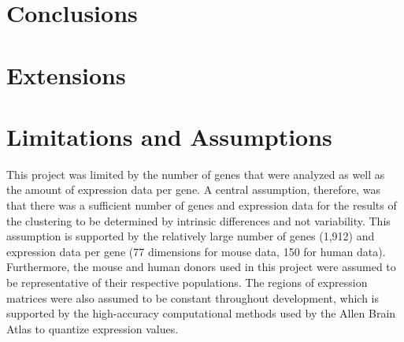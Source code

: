 \documentclass[12pt,oneside,onecolumn,a4paper]{article}
\begin{document}
\section{Conclusions}

\section{Extensions}




\appendix

\section{Limitations and Assumptions}

This project was limited by the number of genes that were analyzed as well as the amount of expression data per gene. A central assumption, therefore, was that there was a sufficient number of genes and expression data for the results of the clustering to be determined by intrinsic differences and not variability. This assumption is supported by the relatively large number of genes (1,912) and expression data per gene (77 dimensions for mouse data, 150 for human data). Furthermore, the mouse and human donors used in this project were assumed to be representative of their respective populations. The regions of expression matrices were also assumed to be constant throughout development, which is supported by the high-accuracy computational methods used by the Allen Brain Atlas to quantize expression values.
\end{document}
